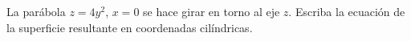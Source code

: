 \item La parábola $z = 4y^2$, $x = 0$ se hace girar en torno al eje $z$. Escriba la ecuación de la superficie resultante en coordenadas cilíndricas.

